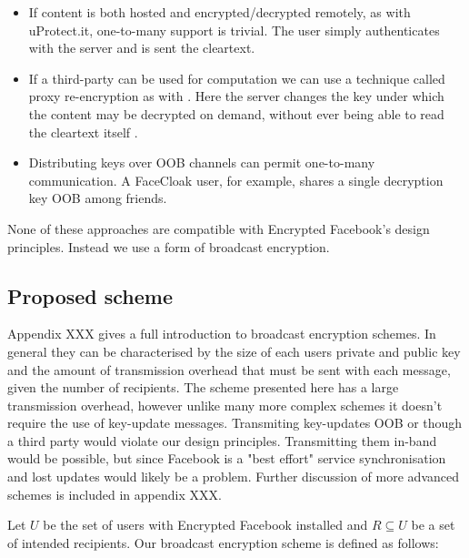 \begin{itemize}

    \item If content is both hosted and encrypted/decrypted remotely, as with uProtect.it, one-to-many support is trivial. The user simply authenticates with the server and is sent the cleartext.
    
    \item If a third-party can be used for computation we can use a technique called proxy re-encryption as with \cite{flybynight}. Here the server changes the key under which the content may be decrypted on demand, without ever being able to read the cleartext itself \cite{proxy}.
    
    \item Distributing keys over \ac{OOB} channels can permit one-to-many communication. A FaceCloak user, for example, shares a single decryption key \ac{OOB} among friends.

\end{itemize}

None of these approaches are compatible with Encrypted Facebook's design principles. Instead we use a form of broadcast encryption.


\FloatBarrier
\subsection{Proposed scheme}

Appendix XXX gives a full introduction to broadcast encryption schemes. In general they can be characterised by the size of each users private and public key and the amount of transmission overhead that must be sent with each message, given the number of recipients. The scheme presented here has a large transmission overhead, however unlike many more complex schemes it doesn't require the use of key-update messages. Transmiting key-updates \ac{OOB} or though a third party would violate our design principles. Transmitting them in-band would be possible, but since Facebook is a "best effort" service synchronisation and lost updates would likely be a problem. Further discussion of more advanced schemes is included in appendix XXX.

Let $U$ be the set of users with Encrypted Facebook installed and $R \subseteq U$ be a set of intended recipients. Our broadcast encryption scheme is defined as follows:


